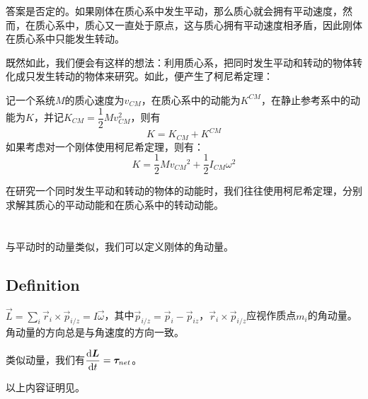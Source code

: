 答案是否定的。如果刚体在质心系中发生平动，那么质心就会拥有平动速度，然而，在质心系中，质心又一直处于原点，这与质心拥有平动速度相矛盾，因此刚体在质心系中只能发生转动。

既然如此，我们便会有这样的想法：利用质心系，把同时发生平动和转动的物体转化成只发生转动的物体来研究。如此，便产生了柯尼希定理：
\begin{law}
	记一个系统$M$的质心速度为$v_{CM}$，在质心系中的动能为$K^{CM}$，在静止参考系中的动能为$K$，并记$K_{CM}=\dfrac{1}{2}Mv_{CM}^2$，则有
	\[K=K_{CM}+K^{CM}\]
	如果考虑对一个刚体使用柯尼希定理，则有：
	\[K=\dfrac{1}{2}Mv_{CM}{}^2+\dfrac{1}{2}I_{CM}\omega^2\]
\end{law}

在研究一个同时发生平动和转动的物体的动能时，我们往往使用柯尼希定理，分别求解其质心的平动动能和在质心系中的转动动能。
\section[角动量]{}
与平动时的动量类似，我们可以定义刚体的角动量。
\subsection[定义]{Definition}
\begin{Itemize}
	\item {} $\displaystyle\vec{L}=\sum_i\vec{r}_i\times\vec{p}_{i/z}=I\vec{\omega}$，其中$\vec{p}_{i/z}=\vec{p}_i-\vec{p}_{iz}$，$ \vec{r}_i\times\vec{p}_{i/z}$应视作质点$m_i$的角动量。角动量的方向总是与角速度的方向一致\footnotemark。
	\item 类似动量，我们有$\dfrac{\mathrm{d} \boldsymbol{L}}{\mathrm{d} t}=\boldsymbol{\tau}_{net}$。
\end{Itemize}
以上内容证明见。


